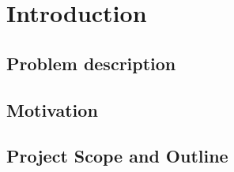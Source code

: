 \chapter{Introduction}
\label{chap:introduction}


\section{Problem description}
\label{sec:problem_description}

\section{Motivation}
\label{sec:motivation}

\section{Project Scope and Outline}
\label{sec:project_scop_and_outline}
